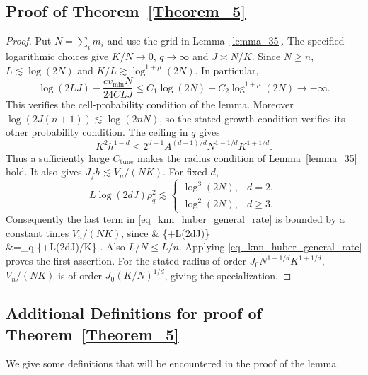 \documentclass[twoside,11pt]{article}
\newenvironment{revision}{\color{revisionred}}{}
\begin{document}
\subsection{Proof of  Theorem~\ref{Theorem_5}}
\begin{revision}
\begin{proof}
Put $N=\sum_i m_i$ and use the grid in Lemma~\ref{lemma_35}.
The specified logarithmic choices give $K/N\to0$, $q\to\infty$ and
$J\asymp N/K$. Since $N\ge n$, $L\lesssim\log(2N)$ and
$K/L\gtrsim\log^{1+\mu}(2N)$. In particular,
\[
\log(2LJ)-\frac{cv_{\min}N}{24CLJ}
\le C_1\log(2N)-C_2\log^{1+\mu}(2N)\longrightarrow-\infty.
\]
This verifies the cell-probability condition of the lemma.
Moreover $\log(2J(n+1))\lesssim\log(2nN)$, so the stated growth
condition verifies its other probability condition.
The ceiling in $q$ gives
\[
K^2h^{1-d}\le2^{d-1}A^{(d-1)/d}N^{1-1/d}K^{1+1/d}.
\]
Thus a sufficiently large $C_{\mathrm{tune}}$ makes the radius
condition of Lemma~\ref{lemma_35} hold. It also gives
$J_fh\lesssim V_n/(NK)$.
For fixed $d$,
\[
L\log(2dJ)\rho_q^2\lesssim
\begin{cases}
\log^3(2N),&d=2,\\
\log^2(2N),&d\ge3.
\end{cases}
\]
Consequently the last term in \eqref{eq_knn_huber_general_rate}
is bounded by a constant times $V_n/(NK)$, since
\bea
&
 \{+L\log(2dJ)\}\\
&=\rho_q
 \{+L\log(2dJ)/K\}
\lesssim{}.
\bea
Also $L/N\le L/n$. Applying
\eqref{eq_knn_huber_general_rate} proves the first assertion.
For the stated radius of order
$J_0N^{1-1/d}K^{1+1/d}$, $V_n/(NK)$ is of order
$J_0(K/N)^{1/d}$, giving the specialization.
\end{proof}
\end{revision}

\subsection{Additional Definitions for proof of Theorem~\ref{Theorem_5}}
We give some definitions that will be encountered in the proof of the lemma.  
\end{document}
